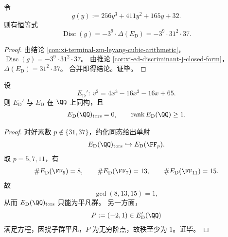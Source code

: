 \begin{theorem}\label{thm:xi-leyang-discriminant-sync-ed}
令
\[
g(y):=256y^{3}+411y^{2}+165y+32.
\]
则有恒等式
\[
\operatorname{Disc}(g)=-3^{9}\cdot \Delta(E_{\mathrm D})
=-3^{9}\cdot 31^{2}\cdot 37.
\]
\end{theorem}
\begin{proof}
由结论 \ref{con:xi-terminal-zm-leyang-cubic-arithmetic}，
\(
\operatorname{Disc}(g)=-3^9\cdot 31^2\cdot 37
\)。
由推论 \ref{cor:xi-ed-discriminant-j-closed-form}，
\(
\Delta(E_{\mathrm D})=31^2\cdot 37
\)。
合并即得结论。证毕。
\end{proof}

\begin{theorem}\label{thm:xi-ed-mordell-weil-torsion-trivial-rank-positive}
设
\[
E_{\mathrm D}':\ v^{2}=4x^{3}-16x^{2}-16x+65.
\]
则 \(E_{\mathrm D}'\) 与 \(E_{\mathrm D}\) 在 \(\QQ\) 上同构，且
\[
E_{\mathrm D}(\QQ)_{\mathrm{tors}}=0,\qquad
\operatorname{rank}E_{\mathrm D}(\QQ)\ge 1.
\]
\end{theorem}
\begin{proof}
对好素数 \(p\notin\{31,37\}\)，约化同态给出单射
\[
E_{\mathrm D}(\QQ)_{\mathrm{tors}}\hookrightarrow E_{\mathrm D}(\FF_p).
\]
取 \(p=5,7,11\)，有
\[
\#E_{\mathrm D}(\FF_5)=8,\qquad
\#E_{\mathrm D}(\FF_7)=13,\qquad
\#E_{\mathrm D}(\FF_{11})=15.
\]
故
\[
\gcd(8,13,15)=1,
\]
从而 \(E_{\mathrm D}(\QQ)_{\mathrm{tors}}\) 只能为平凡群。
另一方面，
\[
P:=(-2,1)\in E_{\mathrm D}'(\QQ)
\]
满足方程，因挠子群平凡，\(P\) 为无穷阶点，故秩至少为 \(1\)。证毕。
\end{proof}

